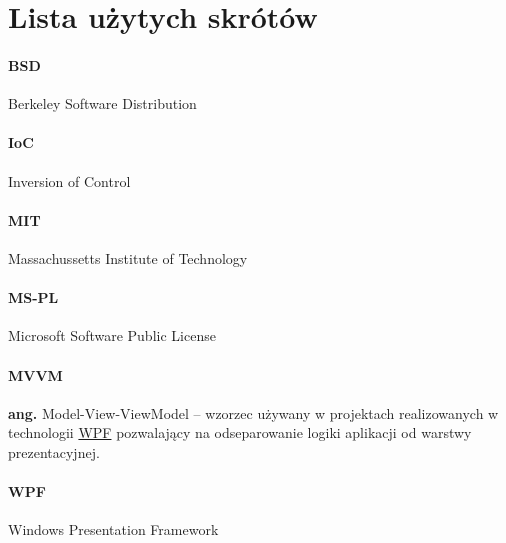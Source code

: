 \documentclass[10pt,a4paper]{article}
\begin{document}

\newpage
\section{Lista użytych skrótów}
\label{abbr:bsd}
\paragraph{BSD} Berkeley Software Distribution

\label{abbr:ioc}
\paragraph{IoC} Inversion of Control

\label{abbr:mit}
\paragraph{MIT} Massachussetts Institute of Technology  

\label{abbr:mspl}
\paragraph{MS-PL} Microsoft Software Public License

\label{abbr:mvvm}
\paragraph{MVVM} \textbf{ang.} Model-View-ViewModel -- wzorzec używany w projektach realizowanych w technologii \hyperref[abbr:wpf]{WPF} pozwalający na odseparowanie logiki aplikacji od warstwy prezentacyjnej. 

\label{abbr:wpf}
\paragraph{WPF} Windows Presentation Framework

\renewcommand*{\refname}{\vspace*{-2em}}
\end{document}
